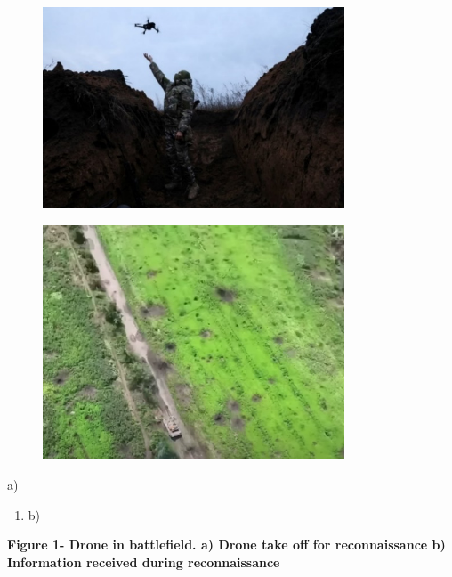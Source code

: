 \begin{figure}[H]
	\centering
	\includegraphics[width=0.8\textwidth]{assets/10}
	\caption*{}
\end{figure}\begin{figure}[H]
	\centering
	\includegraphics[width=0.8\textwidth]{assets/11}
	\caption*{}
\end{figure}

a)

\begin{enumerate}
\def\labelenumi{\alph{enumi})}
\item
  b)
\end{enumerate}

\textbf{Figure 1- Drone in battlefield. a) Drone take off for
reconnaissance b) Information received during reconnaissance}

